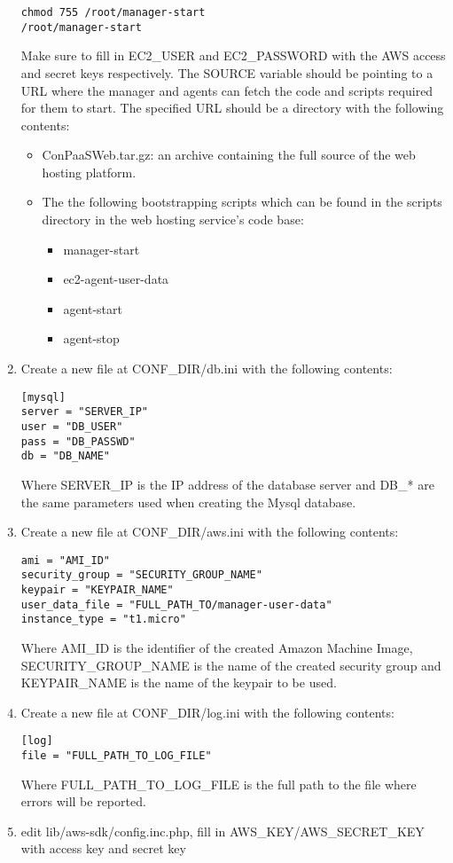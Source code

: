 \documentclass[12pt]{article}
\newenvironment{framedbox}[1]%
{\begin{framed}
 \begingroup
 \fontsize{#1}{#1}\selectfont
}
{
 \endgroup
 \end{framed}
}
\begin{document}
\begin{enumerate}
\begin{framedbox}{8pt}
\begin{verbatim}
chmod 755 /root/manager-start
/root/manager-start
\end{verbatim}\end{framedbox}
Make sure to fill in EC2\_USER and EC2\_PASSWORD with the AWS access and secret
keys respectively. The SOURCE variable should be pointing to a URL where the
manager and agents can fetch the code and scripts required for them to start.
The specified URL should be a directory with the following contents:
\begin{itemize}
\item ConPaaSWeb.tar.gz: an archive containing the full source of the web
      hosting platform.
\item The the following bootstrapping scripts which can be found in the scripts
      directory in the web hosting service's code base:
  \begin{itemize}
    \item manager-start
    \item ec2-agent-user-data
    \item agent-start
    \item agent-stop
  \end{itemize}
\end{itemize}


\item Create a new file at CONF\_DIR/db.ini with the following contents:
\begin{framedbox}{12pt}\begin{verbatim}
[mysql]
server = "SERVER_IP"
user = "DB_USER"
pass = "DB_PASSWD"
db = "DB_NAME"
\end{verbatim}\end{framedbox}
      Where SERVER\_IP is the IP address of the database server and DB\_* are the
      same parameters used when creating the Mysql database.
\item Create a new file at CONF\_DIR/aws.ini with the following contents:
\begin{framedbox}{12pt}\begin{verbatim}
ami = "AMI_ID"
security_group = "SECURITY_GROUP_NAME"
keypair = "KEYPAIR_NAME"
user_data_file = "FULL_PATH_TO/manager-user-data"
instance_type = "t1.micro"
\end{verbatim}\end{framedbox}
      Where AMI\_ID is the identifier of the created Amazon Machine Image,
      SECURITY\_GROUP\_NAME is the name of the created security group and
      KEYPAIR\_NAME is the name of the keypair to be used.
\item Create a new file at CONF\_DIR/log.ini with the following contents:
\begin{framedbox}{12pt}\begin{verbatim}
[log]
file = "FULL_PATH_TO_LOG_FILE"
\end{verbatim}\end{framedbox}
Where FULL\_PATH\_TO\_LOG\_FILE is the full path to the file where errors will be reported.
\item edit lib/aws-sdk/config.inc.php, fill in AWS\_KEY/AWS\_SECRET\_KEY with access key and secret key
\end{enumerate}
\end{document}
